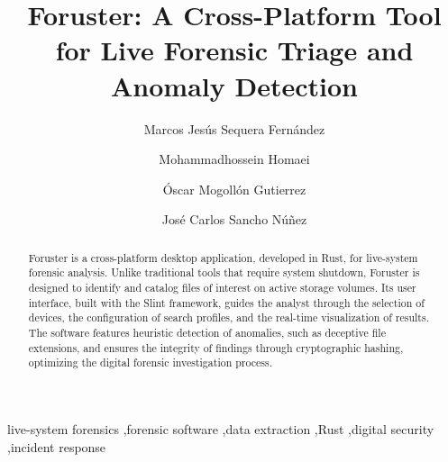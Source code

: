 \documentclass[preprint,12pt,a4paper]{elsarticle}
\begin{document}
\renewcommand{\labelenumii}{\arabic{enumi}.\arabic{enumii}}

\begin{frontmatter}

\title{Foruster: A Cross-Platform Tool for Live Forensic Triage and Anomaly Detection}

\author[label1]{Marcos Jesús Sequera Fernández}
\author[label2]{Mohammadhossein Homaei}
\author[label3]{Óscar Mogollón Gutierrez}
\author[label4]{José Carlos Sancho Núñez}
\address[label1]{marcosjesus@unex.es}
\address[label2]{mhomaein@alumnos.unex.es}
\address[label3]{oscarmg@unex.es}
\address[label4]{jcsanchon@unex.es}

\begin{abstract}
Foruster is a cross-platform desktop application, developed in Rust, for live-system forensic analysis. Unlike traditional tools that require system shutdown, Foruster is designed to identify and catalog files of interest on active storage volumes. Its user interface, built with the Slint framework, guides the analyst through the selection of devices, the configuration of search profiles, and the real-time visualization of results. The software features heuristic detection of anomalies, such as deceptive file extensions, and ensures the integrity of findings through cryptographic hashing, optimizing the digital forensic investigation process.
\end{abstract}

\begin{keyword}
live-system forensics \sep forensic software \sep data extraction \sep Rust \sep digital security \sep incident response
\end{keyword}

\end{frontmatter}
\end{document}
